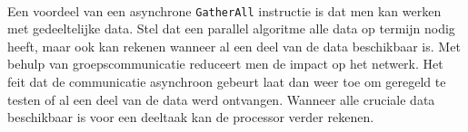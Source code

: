 \paragraph{}
Een voordeel van een asynchrone \texttt{GatherAll} instructie is dat men kan werken met gedeeltelijke data. Stel dat een parallel algoritme alle data op termijn nodig heeft, maar ook kan rekenen wanneer al een deel van de data beschikbaar is. Met behulp van groepscommunicatie reduceert men de impact op het netwerk. Het feit dat de communicatie asynchroon gebeurt laat dan weer toe om geregeld te testen of al een deel van de data werd ontvangen. Wanneer alle cruciale data beschikbaar is voor een deeltaak kan de processor verder rekenen.